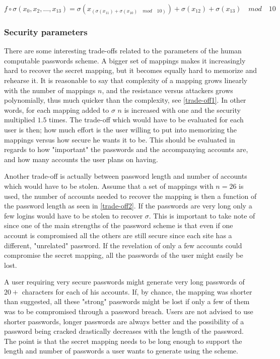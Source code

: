 \begin{definition}
    \label{fo-function}
    $f\circ \sigma(x_0,x_2,\dots,x_{13}) = \sigma ( x_{(\sigma(x_{11}) + \sigma(x_{10})\quad mod \quad 10)} ) +\sigma ( x_{12} ) + \sigma( x_{13} )\quad mod \quad 10$ 
\end{definition}






\subsubsection{Security parameters} \label{sec-params}
\par There are some interesting trade-offs related to the parameters of the human computable passwords scheme. A bigger set of mappings makes it increasingly hard to recover the secret mapping, but it becomes equally hard to memorize and rehearse it. It is reasonable to say that complexity of a mapping grows linearly with the number of mappings $n$, and the resistance versus attackers grows polynomially, thus much quicker than the complexity, see \autoref{trade-off1}. In other words, for each mapping added to $\sigma$ $n$ is increased with one and the security multiplied $1.5$ times. The trade-off which would have to be evaluated for each user is then; how much effort is the user willing to put into memorizing the mappings versus how secure he wants it to be. This should be evaluated in regards to how "important" the passwords and the accompanying accounts are, and how many accounts the user plans on having. 
\par Another trade-off is actually between password length and number of accounts which would have to be stolen. Assume that a set of mappings with $n=26$ is used, the number of accounts needed to recover the mapping is then a function of the password length as seen in \autoref{trade-off2}. If the passwords are very long only a few logins would have to be stolen to recover $\sigma$. This is important to take note of since one of the main strengths of the password scheme is that even if one account is compromised all the others are still secure since each site has a different, "unrelated" password. If the revelation of only a few accounts could compromise the secret mapping, all the passwords of the user might easily be lost.
\par A user requiring very secure passwords might generate very long passwords of $20+$ characters for each of his accounts. If, by chance, the mapping was shorter than suggested, all these "strong" passwords might be lost if only a few of them was to be compromised through a password breach. Users are not advised to use shorter passwords, longer passwords are always better and the possibility of a password being cracked drastically decreases with the length of the password. The point is that the secret mapping needs to be long enough to support the length and number of passwords a user wants to generate using the scheme.
